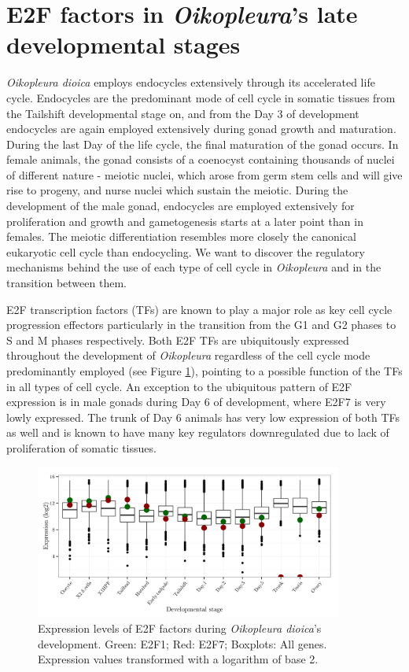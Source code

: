 \documentclass[11pt,twoside,a4paper]{report}
\begin{document}
\section{E2F factors in \textit{Oikopleura}'s late developmental stages}
	\textit{Oikopleura dioica} employs endocycles extensively through its accelerated life cycle. Endocycles are the predominant mode of cell cycle in somatic tissues from the Tailshift developmental stage on, and from the Day 3 of development endocycles are again employed extensively during gonad growth and maturation. During the last Day of the life cycle, the final maturation of the gonad occurs. In female animals, the gonad consists of a coenocyst containing thousands of nuclei of different nature - meiotic nuclei, which arose from germ stem cells and will give rise to progeny, and nurse nuclei which sustain the meiotic. During the development of the male gonad, endocycles are employed extensively for proliferation and growth and gametogenesis starts at a later point than in females. The meiotic differentiation resembles more closely the canonical eukaryotic cell cycle than endocycling. We want to discover the regulatory mechanisms behind the use of each type of cell cycle in \textit{Oikopleura} and in the transition between them.
	
	E2F transcription factors (TFs) are known to play a major role as key cell cycle progression effectors particularly in the transition from the G1 and G2 phases to S and M phases respectively. Both E2F TFs are ubiquitously expressed throughout the development of \textit{Oikopleura} regardless of the cell cycle mode predominantly employed (see Figure \ref{fig:E2F_expression}), pointing to a possible function of the TFs in all types of cell cycle. An exception to the ubiquitous pattern of E2F expression is in male gonads during Day 6 of development, where E2F7 is very lowly expressed. The trunk of Day 6 animals has very low expression of both TFs as well and is known to have many key regulators downregulated due to lack of proliferation of somatic tissues.
	
	\begin{figure}[here]
		\setlength{\belowcaptionskip}{5pt}
		\centering
		\includegraphics[width=0.9\textwidth]{pngs/E2F_expression_+allgenes.png}
		\caption[Expression levels of E2F factors during \textit{Oikopleura}'s development]
		{Expression levels of E2F factors during \textit{Oikopleura dioica}'s development.
			{
				\footnotesize
					Green: E2F1;
					Red: E2F7;
					Boxplots: All genes.
					Expression values transformed with a logarithm of base 2.
			}
		}
		\label{fig:E2F_expression}
	\end{figure}
	
\end{document}
